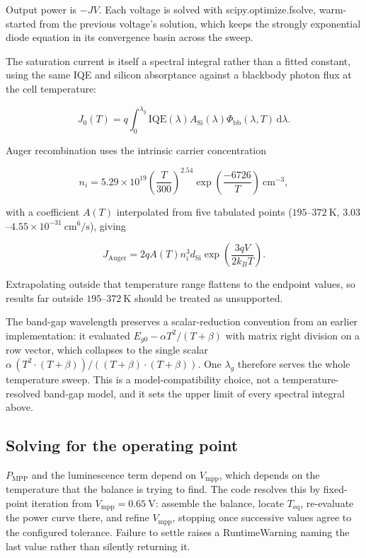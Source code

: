 \documentclass[11pt,a4paper,twoside]{article}
\DeclareRobustCommand{\code}[1]{\begingroup\upshape\ttfamily
  \def\_{\allowbreak\textunderscore\allowbreak}#1\endgroup}
\begin{document}
Output power is \(-JV\). Each voltage is solved with \code{scipy.optimize.fsolve},
warm-started from the previous voltage's solution, which keeps the strongly
exponential diode equation in its convergence basin across the sweep.

The saturation current is itself a spectral integral rather than a fitted
constant, using the same IQE and silicon absorptance against a blackbody photon
flux at the cell temperature:

\begin{equation}
J_0(T)=q\int_0^{\lambda_g}
\mathrm{IQE}(\lambda)A_{\mathrm{Si}}(\lambda)\Phi_{\mathrm{bb}}(\lambda,T)
\,\mathrm{d}\lambda .
\end{equation}

Auger recombination uses the intrinsic carrier concentration

\begin{equation}
n_i = 5.29\times10^{19}
\left(\frac{T}{300}\right)^{2.54}
\exp\!\left(\frac{-6726}{T}\right)~\mathrm{cm^{-3}},
\end{equation}

with a coefficient \(A(T)\) interpolated from five tabulated points
(\(195\)--\(372~\mathrm{K}\), \(3.03\)--\(4.55\times10^{-31}~\mathrm{cm^6/s}\)),
giving

\begin{equation}
J_{\mathrm{Auger}}=2qA(T)n_i^3 d_{\mathrm{Si}}
\exp\!\left(\frac{3qV}{2k_BT}\right).
\end{equation}

Extrapolating outside that temperature range flattens to the endpoint values,
so results far outside \(195\)--\(372~\mathrm{K}\) should be treated as
unsupported.

The band-gap wavelength preserves a scalar-reduction convention from an
earlier implementation: it evaluated \(E_{g0}-\alpha T^2/(T+\beta)\) with
matrix right division on a row vector, which collapses to the single scalar
\(\alpha\,(T^2\!\cdot\!(T+\beta))/((T+\beta)\!\cdot\!(T+\beta))\). One
\(\lambda_g\) therefore serves the whole temperature sweep. This is a
model-compatibility choice, not a temperature-resolved band-gap model, and it
sets the upper limit of every spectral integral above.

\subsection{Solving for the operating point}
\label{sec:fixedpoint}

\(P_{\mathrm{MPP}}\) and the luminescence term depend on \(V_{\mathrm{mpp}}\),
which depends on the temperature that the balance is trying to find. The code
resolves this by fixed-point iteration from \(V_{\mathrm{mpp}}=0.65~\mathrm{V}\):
assemble the balance, locate \(T_{\mathrm{eq}}\), re-evaluate the power curve
there, and refine \(V_{\mathrm{mpp}}\), stopping once successive values agree to
the configured tolerance. Failure to settle raises a
\code{RuntimeWarning} naming the last value rather than silently returning it.
\end{document}
